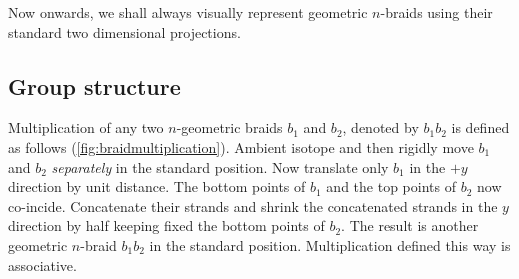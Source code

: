 \documentclass[oneside]{book}
\theoremstyle{definition}
\begin{document}
	Now onwards, we shall always visually represent geometric \(n\)-braids using their standard two dimensional projections.

	\subsection{Group structure}

	Multiplication of any two \(n\)-geometric braids \(b_1\) and \(b_2\), denoted by \(b_1 b_2\) is defined as follows (\cref{fig:braidmultiplication}). Ambient isotope and then rigidly move \(b_1\) and \(b_2\) \textit{separately} in the standard position. Now translate only \(b_1\) in the \(+y\) direction by unit distance. The bottom points of \(b_1\) and the top points of \(b_2\) now co-incide. Concatenate their strands and shrink the concatenated strands in the \(y\) direction by half keeping fixed the bottom points of \(b_2\). The result is another geometric \(n\)-braid \(b_1 b_2\) in the standard position. Multiplication defined this way is associative.
\end{document}
